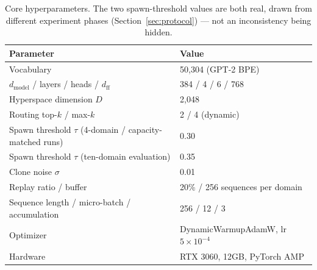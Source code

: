 \documentclass[11pt,letterpaper]{article}
\begin{document}
\begin{table}[h]
\centering
\small
\begin{tabular}{ll}
\toprule
Parameter & Value \\
\midrule
Vocabulary & 50,304 (GPT-2 BPE) \\
$d_{\text{model}}$ / layers / heads / $d_{\text{ff}}$ & 384 / 4 / 6 / 768 \\
Hyperspace dimension $D$ & 2,048 \\
Routing top-$k$ / max-$k$ & 2 / 4 (dynamic) \\
Spawn threshold $\tau$ (4-domain / capacity-matched runs) & 0.30 \\
Spawn threshold $\tau$ (ten-domain evaluation) & 0.35 \\
Clone noise $\sigma$ & 0.01 \\
Replay ratio / buffer & 20\% / 256 sequences per domain \\
Sequence length / micro-batch / accumulation & 256 / 12 / 3 \\
Optimizer & DynamicWarmupAdamW, lr $5\times 10^{-4}$ \\
Hardware & RTX 3060, 12GB, PyTorch AMP \\
\bottomrule
\end{tabular}
\caption{Core hyperparameters. The two spawn-threshold values are both real, drawn from different experiment phases (Section~\ref{sec:protocol}) --- not an inconsistency being hidden.}
\end{table}
\end{document}
